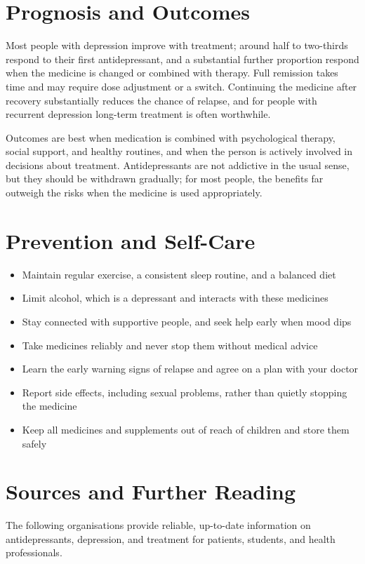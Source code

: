 \section*{Prognosis and Outcomes}
Most people with depression improve with treatment; around half to two-thirds respond to their first antidepressant, and a substantial further proportion respond when the medicine is changed or combined with therapy. Full remission takes time and may require dose adjustment or a switch. Continuing the medicine after recovery substantially reduces the chance of relapse, and for people with recurrent depression long-term treatment is often worthwhile.

Outcomes are best when medication is combined with psychological therapy, social support, and healthy routines, and when the person is actively involved in decisions about treatment. Antidepressants are not addictive in the usual sense, but they should be withdrawn gradually; for most people, the benefits far outweigh the risks when the medicine is used appropriately.

\section*{Prevention and Self-Care}
\begin{itemize}
    \item Maintain regular exercise, a consistent sleep routine, and a balanced diet
    \item Limit alcohol, which is a depressant and interacts with these medicines
    \item Stay connected with supportive people, and seek help early when mood dips
    \item Take medicines reliably and never stop them without medical advice
    \item Learn the early warning signs of relapse and agree on a plan with your doctor
    \item Report side effects, including sexual problems, rather than quietly stopping the medicine
    \item Keep all medicines and supplements out of reach of children and store them safely
\end{itemize}

\section*{Sources and Further Reading}
The following organisations provide reliable, up-to-date information on antidepressants, depression, and treatment for patients, students, and health professionals.

